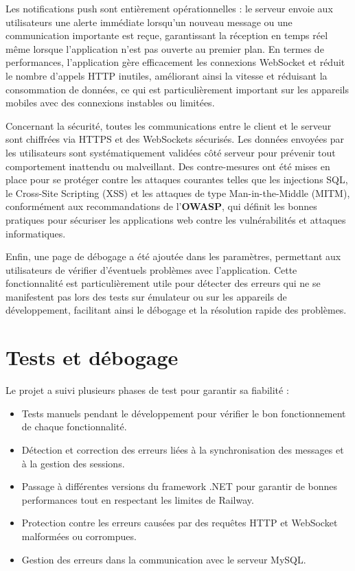 \documentclass[12pt]{report}
\begin{document}
Les notifications push sont entièrement opérationnelles : le serveur envoie aux utilisateurs une alerte immédiate lorsqu'un nouveau message ou une communication importante est reçue, garantissant la réception en temps réel même lorsque l'application n'est pas ouverte au premier plan\supercite{firebase}. En termes de performances, l'application gère efficacement les connexions WebSocket\supercite{websocket} et réduit le nombre d'appels HTTP inutiles\supercite{http}, améliorant ainsi la vitesse et réduisant la consommation de données, ce qui est particulièrement important sur les appareils mobiles avec des connexions instables ou limitées.

Concernant la sécurité, toutes les communications entre le client et le serveur sont chiffrées via HTTPS et des WebSockets sécurisés. Les données envoyées par les utilisateurs sont systématiquement validées côté serveur pour prévenir tout comportement inattendu ou malveillant. Des contre-mesures ont été mises en place pour se protéger contre les attaques courantes telles que les injections SQL, le Cross-Site Scripting (XSS) et les attaques de type Man-in-the-Middle (MITM), conformément aux recommandations de l'\textbf{OWASP}\supercite{owasp}, qui définit les bonnes pratiques pour sécuriser les applications web contre les vulnérabilités et attaques informatiques.

Enfin, une page de débogage a été ajoutée dans les paramètres, permettant aux utilisateurs de vérifier d'éventuels problèmes avec l'application. Cette fonctionnalité est particulièrement utile pour détecter des erreurs qui ne se manifestent pas lors des tests sur émulateur ou sur les appareils de développement, facilitant ainsi le débogage et la résolution rapide des problèmes.

\section{Tests et débogage}

Le projet a suivi plusieurs phases de test pour garantir sa fiabilité :

\begin{itemize}
	\item Tests manuels pendant le développement pour vérifier le bon fonctionnement de chaque fonctionnalité.
	\item Détection et correction des erreurs liées à la synchronisation des messages et à la gestion des sessions.
	\item Passage à différentes versions du framework .NET pour garantir de bonnes performances tout en respectant les limites de Railway.
	\item Protection contre les erreurs causées par des requêtes HTTP et WebSocket malformées ou corrompues.
	\item Gestion des erreurs dans la communication avec le serveur MySQL.
\end{itemize}
\end{document}
